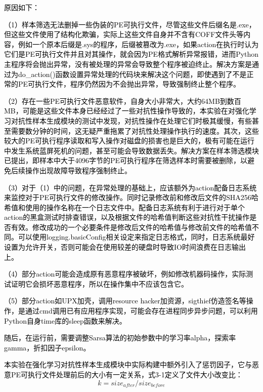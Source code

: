 \textcolor{black}{原因如下：}

\textcolor{black}{（1）样本筛选无法删掉一些伪装的PE可执行文件，尽管这些文件后缀名是.exe，但这些文件使用了结构化欺骗，实际上这些文件自身并不含有COFF文件头等内容，例如一个原本后缀是.sys的程序，后缀被篡改为.exe，如果action在执行时认为它们是PE可执行文件并且对其操作，就会因为PE格式解析异常报错，进而Python主程序将会抛出异常，没有被处理的异常会导致整个程序被迫终止。解决方案是通过为do\_action()函数设置异常处理的代码块来解决这个问题，即使遇到了不是正常的PE可执行文件，程序仍然因为不会抛出异常，导致强制终止整个程序。}

\textcolor{black}{（2）存在一些PE可执行文件恶意软件，自身大小非常大，大约64MB到数百MB，可能是这些文件本身已经经过了一些对抗性操作导致的，本实验在对强化学习对抗性样本生成模块的测试中发现，对抗性操作在处理它们时极其缓慢，有些甚至需要数分钟的时间，这无疑严重拖累了对抗性处理操作执行的速度。其次，这些较大的PE可执行程序读取和写入操作对磁盘的损害也是巨大的，极有可能在运行中发生系统蓝屏死机的问题，甚至可能会导致数据丢失。解决方案在样本筛选模块已提出，即样本中大于4096字节的PE可执行程序在筛选样本时需要被删除，以避免后续操作出现故障导致程序强制终止。}

\textcolor{black}{（3）对于（1）中的问题，在异常处理的基础上，应该额外为action配备日志系统来监控对于PE可执行文件的修改操作。同时记录修改前和修改后文件的SHA256哈希值和使用的操作名称在一个日志文件中。配备日志系统有利于进行对于单个action的黑盒测试时排查错误，以及根据文件的哈希值判断这些对抗性干扰操作是否有效。修改成功的一个必要条件是修改后文件的哈希值与修改前文件的哈希值不同。可以使用logging.basicConfig相关设定来指定日志格式，同时，日志系统最好设置为允许开关，否则可能会在使用较差的硬盘时导致IO时间浪费在日志输出上。}

\textcolor{black}{（4）部分action可能会造成原有恶意程序被破坏，例如修改机器码操作，实际测试证明它会损坏恶意程序，所以在操作集中不应该包含它。}

\textcolor{black}{（5）部分action如UPX加壳，调用resource hacker加资源，sigthief仿造签名等操作，是通过cmd调用已有应用程序实现，可能会存在进程同步异步问题，可以利用Python自身time库的sleep函数来解决。}

\textcolor{black}{随后，在运行前，需要调整Sarsa算法的初始参数中的学习率alpha，探索率gamma，折扣因子epsilon。}

\textcolor{black}{本实验在强化学习对抗性样本生成模块中实际构建中额外引入了惩罚因子，它与恶意PE可执行文件处理前后的大小有一定关系，式3-1定义了文件大小改变比：}
\begin{equation}
    k=size_{after}/size_{before}
\end{equation}

